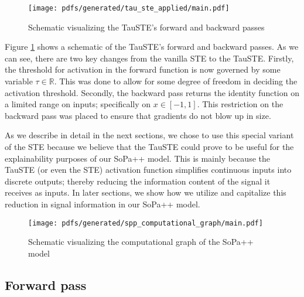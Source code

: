 \begin{figure}[t!]
  \centering
  \texttt{[image: pdfs/generated/tau\_ste\_applied/main.pdf]}
  \caption{Schematic visualizing the TauSTE's forward and backward passes}
  \label{fig:tau-ste}
\end{figure}

Figure \ref{fig:tau-ste} shows a schematic of the TauSTE's forward and backward
passes. As we can see, there are two key changes from the vanilla STE to the
TauSTE. Firstly, the threshold for activation in the forward function is now
governed by some variable $\tau \in \mathbb{R}$. This was done to allow for some degree of freedom
in deciding the activation threshold. Secondly, the backward pass returns the
identity function on a limited range on inputs; specifically on $x \in [-1,1]$.
This restriction on the backward pass was placed to ensure that gradients do not
blow up in size.

As we describe in detail in the next sections, we chose to use this special
variant of the STE because we believe that the TauSTE could prove to be useful
for the explainability purposes of our SoPa++ model. This is mainly because the
TauSTE (or even the STE) activation function simplifies continuous inputs into
discrete outputs; thereby reducing the information content of the signal it
receives as inputs. In later sections, we show how we utilize and capitalize
this reduction in signal information in our SoPa++ model.

\begin{figure}[t!]
  \centering
  \texttt{[image: pdfs/generated/spp\_computational\_graph/main.pdf]}
  \caption{Schematic visualizing the computational graph of the SoPa++ model}
  \label{fig:cg-spp}
\end{figure}

\subsection{Forward pass}

